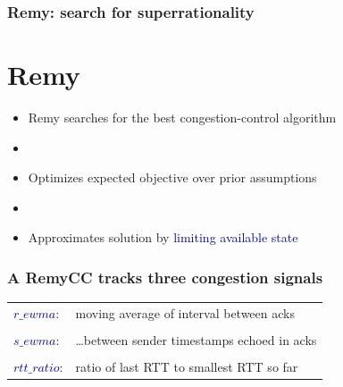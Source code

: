 \documentclass[svgnames]{beamer}
\begin{document}
\begin{frame}
\frametitle{Remy: search for superrationality}

\section{Remy}

\large

\begin{itemize}

\item Remy searches for the best congestion-control algorithm

\item[]

\item Optimizes expected objective over prior assumptions

\item[]

\item Approximates solution by \textcolor{DarkBlue}{limiting available state}

\end{itemize}

\end{frame}

\begin{frame}
\frametitle{A RemyCC tracks three congestion signals}

\Large

\noindent \hspace{-0.75 cm}\begin{tabular}{ll}
\textcolor{DarkBlue}{$r\_ewma$}: & moving average of interval between acks \\

\\

\textcolor{DarkBlue}{$s\_ewma$}: & \ldots between sender timestamps echoed in acks \\

\\

\textcolor{DarkBlue}{$rtt\_ratio$}: & ratio of last RTT to smallest RTT so far \\

\end{tabular}

\end{frame}
\end{document}
